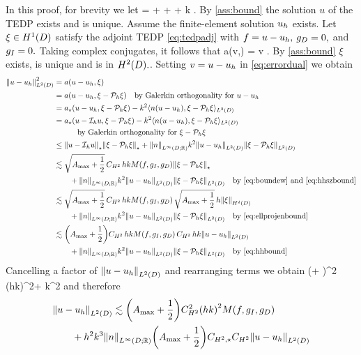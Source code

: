 In this proof, for brevity we let
\beqs
\rhs =  + \Nunsure{\gI} + \NLtGD{\gradGD \gD} + k \NLtGD{\gD}.
\eeqs
By \cref{ass:bound} the solution $u$ of the TEDP exists and is unique. Assume the finite-element solution $u_{h}$ exists. Let $\xi \in \HoD$ satisfy the adjoint TEDP \eqref{eq:tedpadj} with $f=u-u_{h},$ $g_{D}=0,$ and $g_{I}=0.$ Taking complex conjugates, it follows that
\beq\label{eq:errordual}
a(v,\xi) =  \tfa v \in \HoD.
\eeq
By \cref{ass:bound} $\xi$ exists, is unique and is in $\HtD.$. Setting $v = u-u_{h}$ in \eqref{eq:errordual} we obtain
\begin{align*}
  \NLtD{u-\uh}^2 &= a\mleft(u-\uh,\xi\mright)\\
                 &= a\mleft(u-\uh,\xi-\Ph \xi\mright) \quad\text{by Galerkin orthogonality for } u-\uh\\
                 &= \api\mleft(u-\uh,\xi-\Ph \xi\mright) - k^2 \IPLtD{n\mleft(u-\uh\mright)}{\xi-\Ph \xi}\\
                 &= \api\mleft(u-\Ih u,\xi-\Ph \xi\mright) - k^2 \IPLtD{n\mleft(u-\uh\mright)}{\xi-\Ph \xi}\\
  &\quad\quad\quad\text{by Galerkin orthogonality for }\xi  - \Ph \xi\\
                 &\leq \Npi{u-\Ih u}\Npi{\xi - \Ph \xi} + \NLiDRR{n} k^2 \NLtD{u-\uh}\NLtD{\xi-\Ph \xi}\\
                 &\lesssim \sqrt{\Amax + \half}\, \CHthh\, hk \rhs\Npi{\xi-\Ph \xi}\\
  &\quad\quad+  \NLiDRR{n} k^2 \NLtD{u-\uh}\NLtD{\xi-\Ph \xi}\quad \text{by \eqref{eq:boundew} and \eqref{eq:hhszbound}}\\
                 &\lesssim \sqrt{\Amax + \half}\, \CHthh\, hk\rhs\,\sqrt{\Amax + \half}\,h\NHtD{\xi}\\
                 &\quad\quad  + \NLiDRR{n} k^2 \NLtD{u-\uh}\NLtD{\xi-\Ph \xi}\quad \text{by \eqref{eq:ellprojenbound}}\\
                 &\lesssim \mleft(\Amax + \half\mright)\CHthh\, hk\rhs \, \CHthh \,hk \NLtD{u-\uh}\\
&\quad\quad  + \NLiDRR{n} k^2 \NLtD{u-\uh}\NLtD{\xi-\Ph \xi}\quad \text{by \eqref{eq:hhbound}}\\
\end{align*}
Cancelling a factor of $\NLtD{u-\uh}$ and rearranging terms we obtain
\beqs
{} \lesssim \mleft(\Amax + \half\mright)\CHthh^2 \mleft(hk\mright)^2\rhs + k^2  \NLtD{\xi - \Ph \xi}
\eeqs
and therefore
\begin{align*}
&  \NLtD{u-\uh} \lesssim \mleft(\Amax + \half\mright)\CHthh^2 \mleft(hk\mright)^2 \rhs\\
&\quad\quad  + h^2k^3 \NLiDRR{n} \mleft(\Amax + \half\mright) \CHtell \CHthh \NLtD{u-\uh}
\end{align*}
